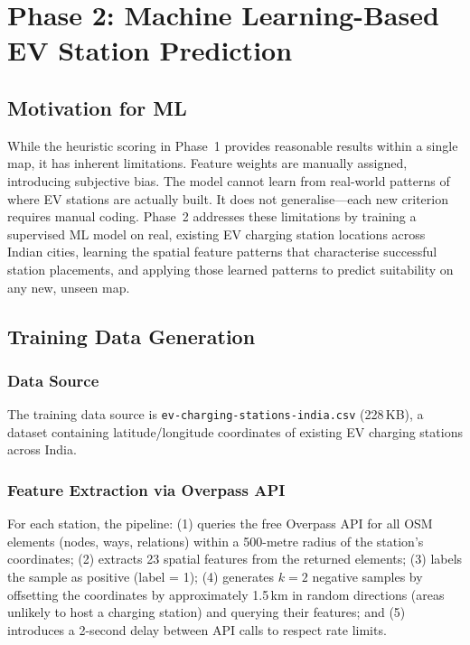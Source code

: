 \documentclass[conference]{IEEEtran}
\begin{document}
\section{Phase 2: Machine Learning-Based EV Station Prediction}

\subsection{Motivation for ML}

While the heuristic scoring in Phase~1 provides reasonable results within a single map, it has inherent limitations. Feature weights are manually assigned, introducing subjective bias. The model cannot learn from real-world patterns of where EV stations are actually built. It does not generalise---each new criterion requires manual coding. Phase~2 addresses these limitations by training a supervised ML model on real, existing EV charging station locations across Indian cities, learning the spatial feature patterns that characterise successful station placements, and applying those learned patterns to predict suitability on any new, unseen map.

\subsection{Training Data Generation}

\subsubsection{Data Source}

The training data source is \texttt{ev-charging-stations-india.csv} (228\,KB), a dataset containing latitude/longitude coordinates of existing EV charging stations across India.

\subsubsection{Feature Extraction via Overpass API}

For each station, the pipeline: (1) queries the free Overpass API for all OSM elements (nodes, ways, relations) within a 500-metre radius of the station's coordinates; (2) extracts 23 spatial features from the returned elements; (3) labels the sample as positive (label = 1); (4) generates $k = 2$ negative samples by offsetting the coordinates by approximately 1.5\,km in random directions (areas unlikely to host a charging station) and querying their features; and (5) introduces a 2-second delay between API calls to respect rate limits.
\end{document}
